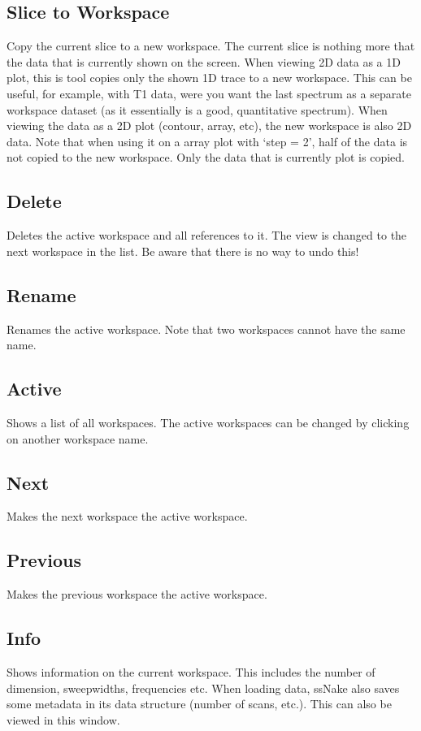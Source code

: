 \documentclass[11pt,a4paper]{article}
\begin{document}
\subsection{Slice to Workspace}
Copy the current slice to a new workspace. The current slice is nothing more that the data that is
currently shown on the screen. When viewing 2D data as a 1D plot, this is tool copies only the shown
1D trace to a new workspace. This can be useful, for example, with T1 data, were you want the last
spectrum as a separate workspace dataset (as it essentially is a good, quantitative spectrum). When
viewing the data as a 2D plot (contour, array, etc), the new workspace is also 2D data. Note that
when using it on a array plot with `step = 2', half of the data is not copied to the new workspace.
Only the data that is currently plot is copied.


\subsection{Delete}
Deletes the active workspace and all references to it. The view is changed to the next workspace in the list. Be aware that there is no way to undo this!

\subsection{Rename}
Renames the active workspace. Note that two workspaces cannot have the same name.

\subsection{Active}
Shows a list of all workspaces. The active workspaces can be changed by clicking on another workspace name.

\subsection{Next}
Makes the next workspace the active workspace.

\subsection{Previous}
Makes the previous workspace the active workspace.

\subsection{Info}
Shows information on the current workspace. This includes the number of dimension, sweepwidths,
frequencies etc. When loading data, ssNake also saves some metadata in its data structure (number of
scans, etc.).
This can also be viewed in this window.
\end{document}

